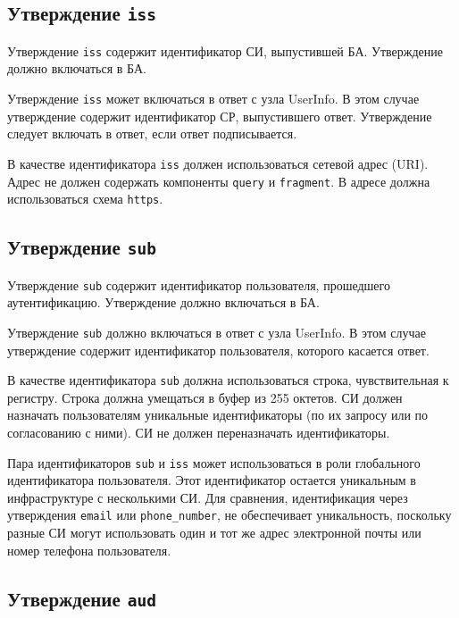 \label{CLAIMS.Auth}

\subsection{Утверждение \lstinline{iss}}\label{CLAIMS.Iss}

Утверждение \lstinline{iss} содержит идентификатор СИ, выпустившей БА.
%
Утверждение должно включаться в БА.

Утверждение \lstinline{iss} может включаться в ответ с узла UserInfo.
В этом случае утверждение содержит идентификатор СР, выпустившего ответ.
%
Утверждение следует включать в ответ, если ответ подписывается.

В качестве идентификатора \lstinline{iss} должен использоваться сетевой адрес 
(URI). 
%
Адрес не должен содержать компоненты \lstinline{query} и \lstinline{fragment}.
%
В адресе должна использоваться схема \lstinline{https}.

\subsection{Утверждение \lstinline{sub}}\label{CLAIMS.Sub}

Утверждение \lstinline{sub} содержит идентификатор пользователя, 
прошедшего аутентификацию.
%
Утверждение должно включаться в БА.

Утверждение \lstinline{sub} должно включаться в ответ с узла UserInfo.
%
В этом случае утверждение содержит идентификатор пользователя, которого 
касается ответ.

В качестве идентификатора \lstinline{sub} должна использоваться строка,
чувствительная к регистру. Строка должна умещаться в буфер из 255 октетов.
%
СИ должен назначать пользователям уникальные идентификаторы (по их запросу или 
по согласованию с ними). СИ не должен переназначать идентификаторы.

\begin{note*}
Пара идентификаторов \lstinline{sub} и \lstinline{iss} может использоваться
в роли глобального идентификатора пользователя. Этот идентификатор 
остается уникальным в инфраструктуре с несколькими СИ.
%
Для сравнения, идентификация через утверждения \lstinline{email} или 
\lstinline{phone_number}, не обеспечивает уникальность, 
поскольку разные СИ могут использовать один и тот же адрес 
электронной почты или номер телефона пользователя.
\end{note*}

\subsection{Утверждение \lstinline{aud}}\label{CLAIMS.Aud}


